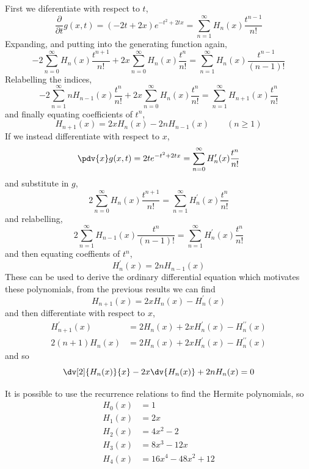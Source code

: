 First we diferentiate with respect to $t$,
\[ \frac{\partial}{\partial t} g(x,t) = (-2t+2x) e^{-t^2+2tx} =
\sum^{\infty}_{n=1} H_n(x) \frac{t^{n-1}}{n!} \] Expanding, and
putting into the generating function again,
\[ -2 \sum^{\infty}_{n=0} H_n(x) \frac{t^{n+1}}{n!} + 2x
\sum^{\infty}_{n=0} H_n(x) \frac{t^n}{n!} = \sum^{\infty}_{n=1}
H_n(x)\frac{t^{n-1}}{(n-1)!} \]
Relabelling the indices,
\[ -2 \sum^{\infty}_{n=1} nH_{n-1}(x) \frac{t^{n}}{n!} + 2x
\sum^{\infty}_{n=0} H_n(x) \frac{t^n}{n!} = \sum^{\infty}_{n=1}
H_{n+1}(x)\frac{t^n}{n!} \]
and finally equating coefficients of $t^n$, 
\begin{equation}
  \label{eq:recurrencehermite}
  H_{n+1}(x) = 2x H_n(x) - 2n H_{n-1}(x) \qquad (n \ge 1)
\end{equation}
If we instead differentiate with respect to $x$,
\[ \pdv{x}g(x,t) = 2t e^{-t^2+2tx} = \sum_{n=0}^{\infty} H^{\prime}_n(x) \frac{t^n}{n!} \]
and substitute in $g$,
\[ 2 \sum_{n=0}^{\infty} H_n(x) \frac{t^{n+1}}{n!} = \sum_{n=1}^{\infty} H^{\prime}_n(x) \frac{t^n}{n!}\]
and relabelling,
\[ 2 \sum_{n=1}^{\infty} H_{n-1}(x) \frac{t^{n}}{(n-1)!} = \sum_{n=1}^{\infty} H^{\prime}_n(x) \frac{t^n}{n!}\]
and then equating coeffients of $t^n$,
\begin{equation}
  \label{eq:recurrencehermite2}
  H_n^{\prime}(x) = 2n H_{n-1}(x)
\end{equation}
These can be used to derive the ordinary differential equation which
motivates these polynomials,
from the previous results we can find
\[ H_{n+1}(x) = 2x H_n(x) - H^{\prime}_n(x) \]
and then differentiate with respect to $x$,
\begin{align*}
  H^{\prime}_{n+1}(x) &= 2 H_n(x) + 2x H^{\prime}_n(x) - H^{\prime \prime}_n(x) \\
  2(n+1)H_{n}(x) &= 2 H_n(x) + 2x H^{\prime}_n(x) - H^{\prime \prime}_n(x) 
\end{align*}
and so
\begin{equation*}
  \dv[2]{H_n(x)}{x} - 2x \dv{H_n(x)} + 2n H_n(x) = 0
\end{equation*}

It is possible to use the recurrence relations to find the Hermite polynomials,
so
\begin{align*}
  H_0(x) &=  1 \\
  H_1(x) &=  2x \\
  H_2(x) &=  4x^2 - 2 \\
  H_3(x) &=  8x^3 - 12x \\
  H_4(x) &=  16x^4 - 48x^2 + 12
\end{align*}

